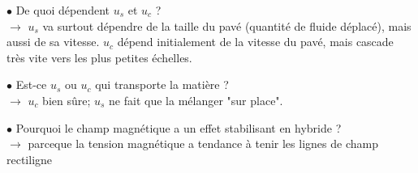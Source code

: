 \documentclass[10pt]{letter}
\begin{document}
$\bullet$ De quoi dépendent $u_s$ et $u_c$ ? \\
$\rightarrow$ $u_s$ va surtout dépendre de la taille du pavé (quantité de fluide déplacé), mais aussi de sa vitesse. $u_c$ dépend initialement de la vitesse du pavé, mais cascade très vite vers les plus petites échelles.

$\bullet$ Est-ce $u_s$ ou $u_c$ qui transporte la matière ? \\
$\rightarrow$ $u_c$ bien sûre; $u_s$ ne fait que la mélanger "sur place".

$\bullet$ Pourquoi le champ magnétique a un effet stabilisant en hybride ? \\
$\rightarrow$ parceque la tension magnétique a tendance à tenir les lignes de champ rectiligne

\bigskip
\end{document}
